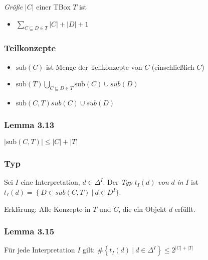 \emph{Größe} $\left| C \right|$ einer TBox $T$ ist

\begin{itemize}
\item
  $\sum_{C \sqsubseteq D \in T}^{}{\left| C \right| + \left| D \right| + 1}$
\end{itemize}

\subsubsection{Teilkonzepte}\label{teilkonzepte}

\begin{itemize}
\item
  $\text{sub}\left( C \right)$ ist Menge der Teilkonzepte von $C$
  (einschließlich $C$)
\item
  $\text{sub}\left( T \right) \bigcup_{C \sqsubseteq D \in T}^{}{\text{sub}\left( C \right) \cup sub\left( D \right)}$
\item
  $\text{sub}\left( C,T \right) sub\left( C \right) \cup sub\left( D \right)$
\end{itemize}

\hypertarget{lemma-3.13}{\subsubsection{Lemma 3.13}\label{lemma-3.13}}

$\left| \text{sub}\left( C,T \right) \right| \leq \left| C \right| + \left| T \right|$

\subsubsection{Typ}\label{typ}

Sei $I$ eine Interpretation, $d \in \Delta^{I}$. Der \emph{Typ}
$t_{I}\left( d \right)$ \emph{von} $d$ \emph{in} $I$ ist
$t_{I}\left( d \right) = \left\{ D \in sub\left( C,T \right)\  \right|\ d \in D^{I}\}$.

Erklärung: Alle Konzepte in $T$ und $C$, die ein Objekt $d$
erfüllt.

\hypertarget{lemma-3.15}{\subsubsection{Lemma 3.15}\label{lemma-3.15}}

Für jede Interpretation $I$ gilt:
$\#\left\{ t_{I}\left( d \right)\ |\ d \in \Delta^{I} \right\} \leq 2^{\left| C \right| + |T|}$

